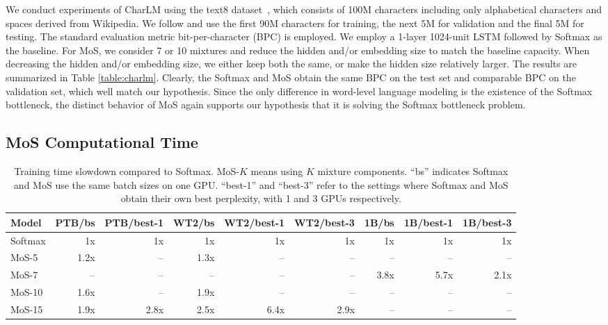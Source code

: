 We conduct experiments of CharLM using the text8 dataset~\citep{mahoney2011large}, which consists of 100M characters including only alphabetical characters and spaces derived from Wikipedia. We follow \citet{mikolov2012subword} and use the first 90M characters for training, the next 5M for validation and the final 5M for testing.
The standard evaluation metric bit-per-character (BPC) is employed.
We employ a 1-layer 1024-unit LSTM followed by Softmax as the baseline. For MoS, we consider 7 or 10 mixtures and reduce the hidden and/or embedding size to match the baseline capacity. When decreasing the hidden and/or embedding size, we either keep both the same, or make the hidden size relatively larger. 
The results are summarized in Table \ref{table:charlm}. Clearly, the Softmax and MoS obtain the same BPC on the test set and comparable BPC on the validation set, which well match our hypothesis.
Since the only difference in word-level language modeling is the existence of the Softmax bottleneck, the distinct behavior of MoS again supports our hypothesis that it is solving the Softmax bottleneck problem.

\subsection{MoS Computational Time}
\label{sec:a-time}
\begin{table}[!h]
	\small
	\centering
	\begin{tabular}{l|rrrrrrrr}
		\toprule
		\bf Model & PTB/bs & PTB/best-1 & WT2/bs & WT2/best-1 & WT2/best-3 & 1B/bs & 1B/best-1 & 1B/best-3 \\
		\midrule
		Softmax & 1x   & 1x	  	& 1x	&1x		&1x		&1x		&1x		&1x\\
		MoS-5   & 1.2x & --	 	& 1.3x	&--		&--		&--		&--		&--\\
		MoS-7	& --   & --		& --	&--		&--		&3.8x	&5.7x	&2.1x\\
		MoS-10  & 1.6x & --		& 1.9x	&--		&--		&--		&--		&--\\
		MoS-15  & 1.9x & 2.8x	& 2.5x	&6.4x	&2.9x	&--		&--		&--\\
		\bottomrule
	\end{tabular}
	\caption{\small Training time slowdown compared to Softmax. MoS-$K$ means using $K$ mixture components. ``bs'' indicates Softmax and MoS use the same batch sizes on one GPU. ``best-1'' and ``best-3'' refer to the settings where Softmax and MoS obtain their own best perplexity, with 1 and 3 GPUs respectively.}
	\label{table:walltime}
\end{table}

